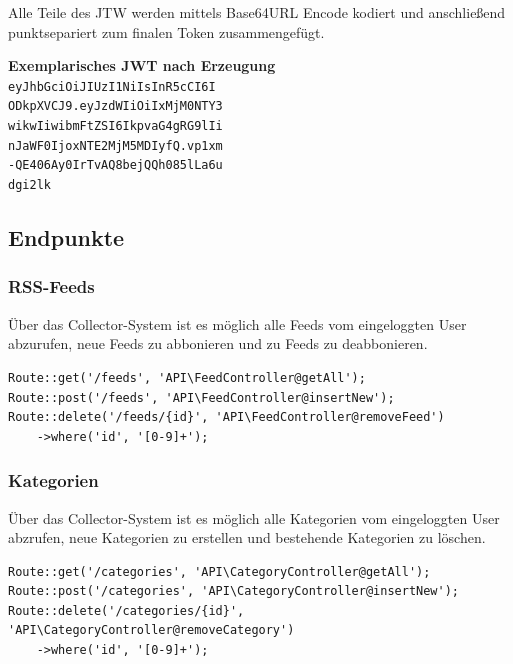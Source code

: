         Alle Teile des JTW werden mittels Base64URL Encode kodiert und anschließend punktsepariert zum finalen Token zusammengefügt.
        
        \begin{center}
            \textbf{Exemplarisches JWT nach Erzeugung} \\
            \texttt{eyJhbGciOiJIUzI1NiIsInR5cCI6I \\
            ODkpXVCJ9.eyJzdWIiOiIxMjM0NTY3 \\
            wikwIiwibmFtZSI6IkpvaG4gRG9lIi \\
            nJaWF0IjoxNTE2MjM5MDIyfQ.vp1xm \\
            -QE406Ay0IrTvAQ8bejQQh085lLa6u \\
            dgi2lk}
        \end{center}
        
    \subsection{Endpunkte}
        
        \subsubsection{RSS-Feeds}
            Über das Collector-System ist es möglich alle Feeds vom eingeloggten User abzurufen, neue Feeds zu abbonieren und zu Feeds zu deabbonieren.
        
            \begin{lstlisting}
Route::get('/feeds', 'API\FeedController@getAll');
Route::post('/feeds', 'API\FeedController@insertNew');
Route::delete('/feeds/{id}', 'API\FeedController@removeFeed')
    ->where('id', '[0-9]+');
            \end{lstlisting}
        
        \subsubsection{Kategorien}
            Über das Collector-System ist es möglich alle Kategorien vom eingeloggten User abzrufen, neue Kategorien zu erstellen und bestehende Kategorien zu löschen.
        
            \begin{lstlisting}
Route::get('/categories', 'API\CategoryController@getAll');
Route::post('/categories', 'API\CategoryController@insertNew');
Route::delete('/categories/{id}', 'API\CategoryController@removeCategory')
    ->where('id', '[0-9]+');
            \end{lstlisting}
        
